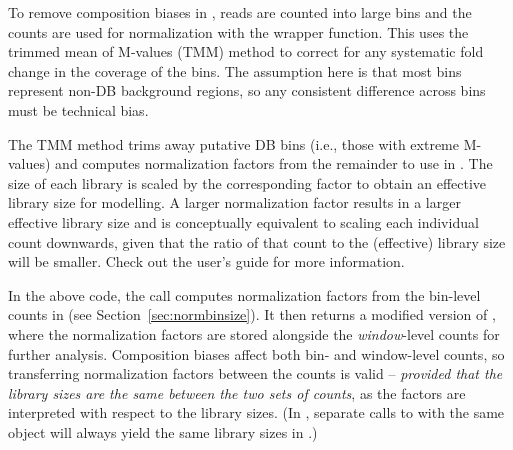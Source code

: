 \documentclass{report}\usepackage[]{graphicx}\usepackage[usenames,dvipsnames]{color}
\newcommand{\hlnum}[1]{\textcolor[rgb]{0.816,0.125,0.439}{#1}}%
\newcommand{\hlopt}[1]{\textcolor[rgb]{0,0,0}{#1}}%
\newcommand{\hlstd}[1]{\textcolor[rgb]{0.251,0.251,0.251}{#1}}%
\newcommand{\hlkwb}[1]{\textcolor[rgb]{0,0,0}{#1}}%
\newcommand{\hlkwc}[1]{\textcolor[rgb]{0.251,0.251,0.251}{#1}}%
\newcommand{\hlkwd}[1]{\textcolor[rgb]{0.878,0.439,0.125}{#1}}%
\newenvironment{knitrout}{}{} %
\begin{document}
To remove composition biases in , reads are counted into large bins and the counts are used for normalization with the  wrapper function.
This uses the trimmed mean of M-values (TMM) method \cite{oshlack2010} to correct for any systematic fold change in the coverage of the bins. 
The assumption here is that most bins represent non-DB background regions, so any consistent difference across bins must be technical bias.

\begin{knitrout}
\color{fgcolor}
\end{knitrout}

The TMM method trims away putative DB bins (i.e., those with extreme M-values) and computes normalization factors from the remainder to use in . 
The size of each library is scaled by the corresponding factor to obtain an effective library size for modelling. 
A larger normalization factor results in a larger effective library size and is conceptually equivalent to scaling each individual count downwards, given that the ratio of that count to the (effective) library size will be smaller. 
Check out the  user's guide for more information.

In the above code, the  call computes normalization factors from the bin-level counts in  (see Section~\ref{sec:normbinsize}).
It then returns a modified version of , where the normalization factors are stored alongside the \textit{window}-level counts for further analysis.
Composition biases affect both bin- and window-level counts, so transferring normalization factors between the counts is valid -- \emph{provided that the library sizes are the same between the two sets of counts}, as the factors are interpreted with respect to the library sizes.
(In , separate calls to  with the same  object will always yield the same library sizes in .)
\end{document}
